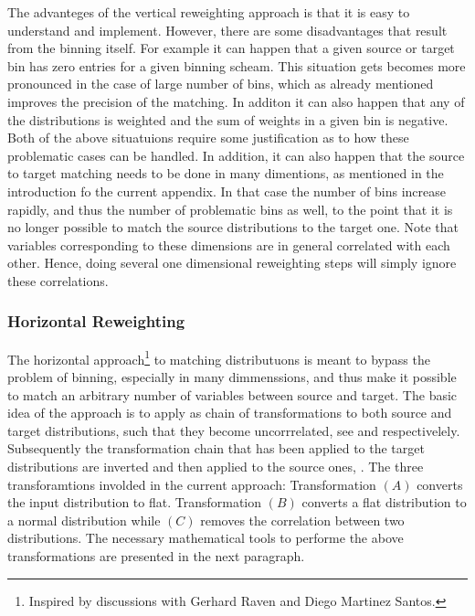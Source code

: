 The advanteges of the vertical reweighting approach is that it is easy to understand and implement.
However, there are some disadvantages that result from the binning itself. For example it can happen
that a given source or target bin has zero entries for a given binning scheam. This situation gets
becomes more pronounced in the case of large number of bins, which as already mentioned improves the
precision of the matching. In additon it can also happen that any of the distributions is weighted and
the sum of weights in a given bin is negative. Both of the above situatuions require some justification
as to how these problematic cases can be handled. In addition, it can also happen that the source to
target matching needs to be done in many dimentions, as mentioned in the introduction fo the current
appendix. In that case the number of bins increase rapidly, and thus the number of problematic bins as well,
to the point that it is no longer possible to match the source distributions to the target one.
Note that variables corresponding to these dimensions are in general correlated with each other.
Hence, doing several one dimensional reweighting steps will simply ignore these correlations.

\subsubsection{Horizontal Reweighting}
The horizontal approach\footnote{Inspired by discussions with Gerhard Raven and Diego Martinez Santos.}
to matching distributuons is meant to bypass the problem of binning, especially in many dimmenssions,
and thus make it possible to match an arbitrary number of variables between source
and target. The basic idea of the approach is to apply as chain of transformations to both source and target
distributions, such that they become uncorrrelated, see  and 
respectivelely. Subsequently the transformation chain that has been applied to the target distributions
are inverted and then applied to the source ones, . The three transforamtions
involded in the current approach: Transformation $(A)$ converts the input distribution to flat.
Transformation $(B)$ converts a flat distribution to a normal distribution while $(C)$ removes
the correlation between two distributions. The necessary mathematical tools to performe the above transformations
are presented in the next paragraph.


